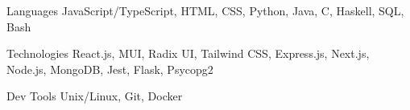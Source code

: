\begin{cvskills}
    \cvskill
        {Languages} %
        {JavaScript/TypeScript, HTML, CSS, Python, Java, C, Haskell, SQL, Bash} %
    
    \cvskill
        {Technologies} %
        {React.js, MUI, Radix UI, Tailwind CSS, Express.js, Next.js, Node.js, MongoDB, Jest, Flask, Psycopg2} %
    
    \cvskill
        {Dev Tools} %
        {Unix/Linux, Git, Docker} %
\end{cvskills}